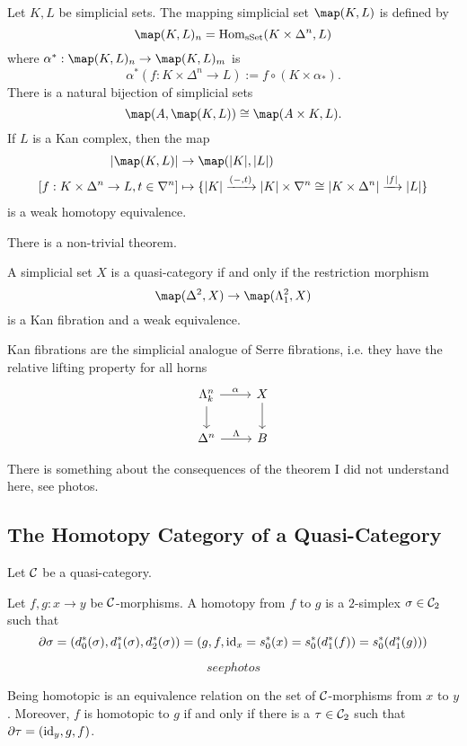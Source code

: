 {Let $K,L$ be simplicial sets. The mapping simplicial set $\map(K,L)$ is defined by
\[\map(K,L)_n=\Hom_\sSet(K\times\Delta^n,L)\]
where $\alpha^*:\map(K,L)_n\to\map(K,L)_m$ is
\[\alpha^*(f:K\times\Delta^n\to L):=f\circ(K\times\alpha_*).\]
There is a natural bijection of simplicial sets
\[\map(A,\map(K,L))\cong\map(A\times K,L).\]
If $L$ is a Kan complex, then the map
\begin{align*}
    |\map(K,L)|&\to\map(|K|,|L|)\\
    [f:K\times\Delta^n\to L,t\in\sx{n}]&\mapsto\cb{|K|\xto{(-,t)}|K|\times\sx{n}\cong|K\times\Delta^n|\xto{|f|}|L|}
\end{align*}
is a weak homotopy equivalence.

There is a non-trivial theorem.

\begin{theorem}[Joyal]
A simplicial set $X$ is a quasi-category if and only if the restriction morphism
\[\map(\Delta^2,X)\to\map(\Lambda^2_1,X)\]
is a Kan fibration and a weak equivalence.
\end{theorem}

Kan fibrations are the simplicial analogue of Serre fibrations, i.e. they have the relative lifting property for all horns
\[
\begin{tikzcd}
\Lambda^n_k \ar[d] \ar[r,"\alpha"] & X \ar[d]\\
\Delta^n \ar[r,"\Lambda"] & B
\end{tikzcd}
\]

There is something about the consequences of the theorem I did not understand here, see photos.

\subsection{The Homotopy Category of a Quasi-Category}

Let $\mathcal{C}$ be a quasi-category.

Let $f,g:x\to y$ be $\mathcal{C}$-morphisms. A homotopy from $f$ to $g$ is a $2$-simplex $\sigma\in\mathcal{C}_2$ such that
\[\partial\sigma=(d_0^*(\sigma),d_1^*(\sigma),d_2^*(\sigma))=(g,f,\operatorname{id}_x=s_0^*(x)=s_0^*(d_1^*(f))=s_0^*(d_1^*(g)))\]

\[
see photos
\]

\begin{proposition}
Being homotopic is an equivalence relation on the set of $\mathcal{C}$-morphisms from $x$ to $y$. Moreover, $f$ is homotopic to $g$ if and only if there is a $\tau\in\mathcal{C}_2$ such that $\partial\tau=(\operatorname{id}_y,g,f)$.


\end{proposition}}
